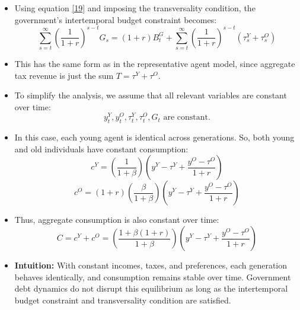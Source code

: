 \documentclass[12pt]{article}
\begin{document}
\begin{itemize}
\item Using equation \eqref{19} and imposing the transversality condition, the government's intertemporal budget constraint becomes:
\[
\sum_{s=t}^{\infty} \left( \frac{1}{1 + r} \right)^{s - t} G_s = (1 + r) B_t^G + \sum_{s=t}^{\infty} \left( \frac{1}{1 + r} \right)^{s - t} (\tau_s^Y + \tau_s^O)
\]

\item This has the same form as in the representative agent model, since aggregate tax revenue is just the sum \( T = \tau^Y + \tau^O \).

\item To simplify the analysis, we assume that all relevant variables are constant over time:
\[
y_t^Y, y_t^O, \tau_t^Y, \tau_t^O, G_t \text{ are constant}.
\]

\item In this case, each young agent is identical across generations. So, both young and old individuals have constant consumption:
\[
c^Y = \left( \frac{1}{1 + \beta} \right) \left( y^Y - \tau^Y + \frac{y^O - \tau^O}{1 + r} \right)
\]
\[
c^O = (1 + r) \left( \frac{\beta}{1 + \beta} \right) \left( y^Y - \tau^Y + \frac{y^O - \tau^O}{1 + r} \right)
\]

\item Thus, aggregate consumption is also constant over time:
\[
C = c^Y + c^O = \left( \frac{1 + \beta(1 + r)}{1 + \beta} \right) \left( y^Y - \tau^Y + \frac{y^O - \tau^O}{1 + r} \right)
\]

\item \textbf{Intuition:} With constant incomes, taxes, and preferences, each generation behaves identically, and consumption remains stable over time. Government debt dynamics do not disrupt this equilibrium as long as the intertemporal budget constraint and transversality condition are satisfied.
\end{itemize}
\end{document}
